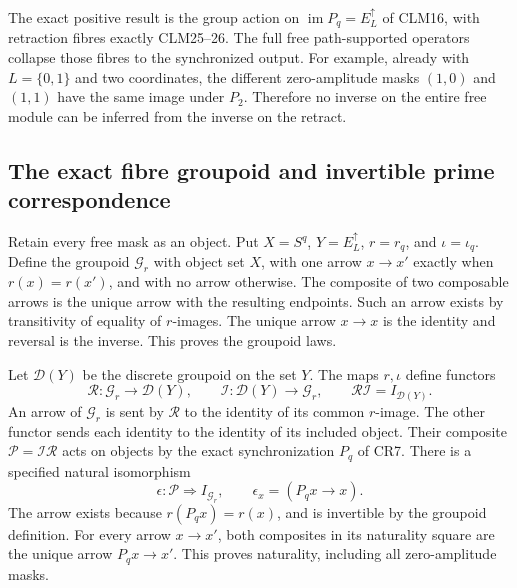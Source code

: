 \documentclass[11pt]{article}
\begin{document}
The exact positive result is the group action on \(\operatorname{im}P_q=E^\uparrow_L\) of CLM16, with retraction fibres exactly CLM25--26. The full free path-supported operators collapse those fibres to the synchronized output. For example, already with \(L=\{0,1\}\) and two coordinates, the different zero-amplitude masks \((1,0)\) and \((1,1)\) have the same image under \(P_2\). Therefore no inverse on the entire free module can be inferred from the inverse on the retract.

\subsection{The exact fibre groupoid and invertible prime correspondence}

Retain every free mask as an object. Put \(X=S^q\), \(Y=E^\uparrow_L\), \(r=r_q\), and \(\iota=\iota_q\). Define the groupoid \(\mathcal G_r\) with object set \(X\), with one arrow \(x\to x'\) exactly when \(r(x)=r(x')\), and with no arrow otherwise. The composite of two composable arrows is the unique arrow with the resulting endpoints. Such an arrow exists by transitivity of equality of \(r\)-images. The unique arrow \(x\to x\) is the identity and reversal is the inverse. This proves the groupoid laws.

Let \(\mathcal D(Y)\) be the discrete groupoid on the set \(Y\). The maps \(r,\iota\) define functors
\[
\mathcal R:\mathcal G_r\longrightarrow\mathcal D(Y),\qquad
\mathcal I:\mathcal D(Y)\longrightarrow\mathcal G_r,\qquad
\mathcal R\mathcal I=I_{\mathcal D(Y)}.
\tag{CR36}
\]
An arrow of \(\mathcal G_r\) is sent by \(\mathcal R\) to the identity of its common \(r\)-image. The other functor sends each identity to the identity of its included object. Their composite \(\mathcal P=\mathcal I\mathcal R\) acts on objects by the exact synchronization \(P_q\) of CR7. There is a specified natural isomorphism
\[
\epsilon:\mathcal P\Longrightarrow I_{\mathcal G_r},\qquad
\epsilon_x=(P_qx\longrightarrow x).
\tag{CR37}
\]
The arrow exists because \(r(P_qx)=r(x)\), and is invertible by the groupoid definition. For every arrow \(x\to x'\), both composites in its naturality square are the unique arrow \(P_qx\to x'\). This proves naturality, including all zero-amplitude masks.
\end{document}
